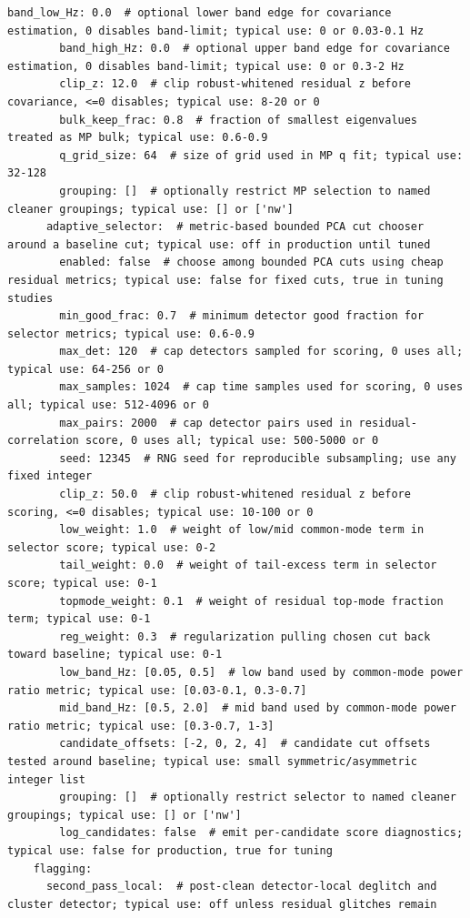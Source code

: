 \documentclass[11pt]{article}
\begin{document}
\begin{lstlisting}[language={}]
        band_low_Hz: 0.0  # optional lower band edge for covariance estimation, 0 disables band-limit; typical use: 0 or 0.03-0.1 Hz
        band_high_Hz: 0.0  # optional upper band edge for covariance estimation, 0 disables band-limit; typical use: 0 or 0.3-2 Hz
        clip_z: 12.0  # clip robust-whitened residual z before covariance, <=0 disables; typical use: 8-20 or 0
        bulk_keep_frac: 0.8  # fraction of smallest eigenvalues treated as MP bulk; typical use: 0.6-0.9
        q_grid_size: 64  # size of grid used in MP q fit; typical use: 32-128
        grouping: []  # optionally restrict MP selection to named cleaner groupings; typical use: [] or ['nw']
      adaptive_selector:  # metric-based bounded PCA cut chooser around a baseline cut; typical use: off in production until tuned
        enabled: false  # choose among bounded PCA cuts using cheap residual metrics; typical use: false for fixed cuts, true in tuning studies
        min_good_frac: 0.7  # minimum detector good fraction for selector metrics; typical use: 0.6-0.9
        max_det: 120  # cap detectors sampled for scoring, 0 uses all; typical use: 64-256 or 0
        max_samples: 1024  # cap time samples used for scoring, 0 uses all; typical use: 512-4096 or 0
        max_pairs: 2000  # cap detector pairs used in residual-correlation score, 0 uses all; typical use: 500-5000 or 0
        seed: 12345  # RNG seed for reproducible subsampling; use any fixed integer
        clip_z: 50.0  # clip robust-whitened residual z before scoring, <=0 disables; typical use: 10-100 or 0
        low_weight: 1.0  # weight of low/mid common-mode term in selector score; typical use: 0-2
        tail_weight: 0.0  # weight of tail-excess term in selector score; typical use: 0-1
        topmode_weight: 0.1  # weight of residual top-mode fraction term; typical use: 0-1
        reg_weight: 0.3  # regularization pulling chosen cut back toward baseline; typical use: 0-1
        low_band_Hz: [0.05, 0.5]  # low band used by common-mode power ratio metric; typical use: [0.03-0.1, 0.3-0.7]
        mid_band_Hz: [0.5, 2.0]  # mid band used by common-mode power ratio metric; typical use: [0.3-0.7, 1-3]
        candidate_offsets: [-2, 0, 2, 4]  # candidate cut offsets tested around baseline; typical use: small symmetric/asymmetric integer list
        grouping: []  # optionally restrict selector to named cleaner groupings; typical use: [] or ['nw']
        log_candidates: false  # emit per-candidate score diagnostics; typical use: false for production, true for tuning
    flagging:
      second_pass_local:  # post-clean detector-local deglitch and cluster detector; typical use: off unless residual glitches remain

\end{lstlisting}
\end{document}
